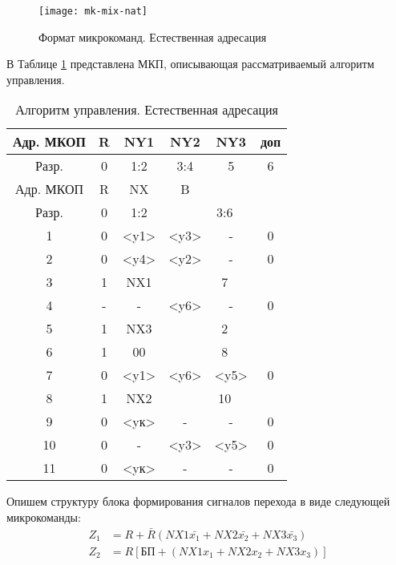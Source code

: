 \documentclass[a4paper,14pt]{extarticle}
\begin{document}
\begin{figure}[h!]
	\centering
	\texttt{[image: mk-mix-nat]}
	\caption{Формат микрокоманд. Естественная адресация}
	\label{fig:mk-mix-nat}
\end{figure}


В Таблице \ref{tab:manage-algorithm2} представлена МКП, описывающая рассматриваемый алгоритм управления. 

\begin{table}[htbp]
	\centering
				\caption{Алгоритм управления. Естественная адресация }
	\begin{tabular}{|c|c|c|c|c|c|}

		\hline
		Адр. МКОП & R & NY1 & NY2 & NY3 & доп \\ \hline
		Разр. & 0 & 1:2 & 3:4 & 5 & 6 \\ \hline
		Адр. МКОП & R & NX & B &  &  \\ \hline
		Разр. & 0 & 1:2 & \multicolumn{ 3}{c|}{3:6} \\ \hline
		1 & 0 & <y1> & <y3> & - & 0 \\ \hline
		2 & 0 & <y4> & <y2> & - & 0 \\ \hline
		3 & 1 & NX1 &  \multicolumn{ 3}{c|}{7}  \\ \hline
		4 & - & - & {<y6>}& - & 0 \\ \hline
		5 & 1 & NX3 &  \multicolumn{ 3}{c|}{2}  \\ \hline
		6 & 1 & 00 & \multicolumn{ 3}{c|}{8}  \\ \hline
		7 & 0 & <y1> & <y6> & <y5> & 0 \\ \hline
		8 & 1 & NX2 &  \multicolumn{ 3}{c|}{10} \\ \hline
		9 & 0 & <yк> & -& -& 0 \\ \hline
		10 & 0 & - & <y3> & <y5> & 0 \\ \hline
		11 & 0 & <yк> & - & - & 0 \\ \hline
	\end{tabular}

	\label{tab:manage-algorithm2}
\end{table}





Опишем структуру блока формирования сигналов перехода в виде следующей
микрокоманды:
\begin{align*}
	Z_1 & =R + \bar{R}\left(NX1\bar{x_1}+NX2\bar{x_2}+NX3\bar{x_3}\right) \\
	Z_2 & = R\left[БП + \left(NX1x_1+NX2x_2+NX3x_3\right)\right]
\end{align*}
\end{document}
